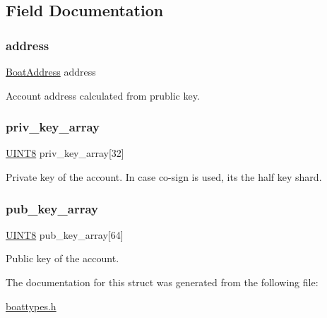 \subsection{Field Documentation}
\mbox{\label{struct_t_account_info_a991241987348c45a080e1dff42dccc6c}} 
\subsubsection{\texorpdfstring{address}{address}}
{\footnotesize\ttfamily \mbox{\hyperlink{boattypes_8h_a18be901fd00e05c6acdbdbab722c6c58}{Boat\+Address}} address}



Account address calculated from prublic key. 

\mbox{\label{struct_t_account_info_a716d4ef9a25584b692e9f09f82bc3985}} 
\subsubsection{\texorpdfstring{priv\+\_\+key\+\_\+array}{priv\_key\_array}}
{\footnotesize\ttfamily \mbox{\hyperlink{boattypes_8h_ab27e9918b538ce9d8ca692479b375b6a}{U\+I\+N\+T8}} priv\+\_\+key\+\_\+array\mbox{[}32\mbox{]}}



Private key of the account. In case co-\/sign is used, it\textquotesingle{}s the half key shard. 

\mbox{\label{struct_t_account_info_aae6e4c3cacff03b34c4165e79679d68b}} 
\subsubsection{\texorpdfstring{pub\+\_\+key\+\_\+array}{pub\_key\_array}}
{\footnotesize\ttfamily \mbox{\hyperlink{boattypes_8h_ab27e9918b538ce9d8ca692479b375b6a}{U\+I\+N\+T8}} pub\+\_\+key\+\_\+array\mbox{[}64\mbox{]}}



Public key of the account. 



The documentation for this struct was generated from the following file\+:\begin{DoxyCompactItemize}
\item 
\mbox{\hyperlink{boattypes_8h}{boattypes.\+h}}\end{DoxyCompactItemize}
